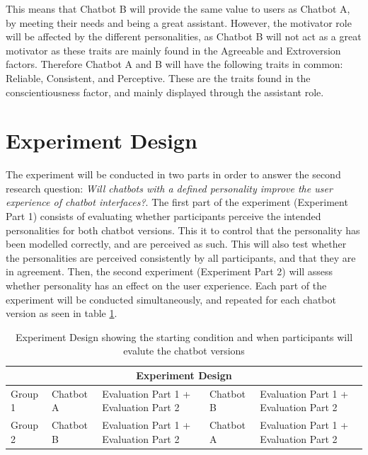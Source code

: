     This means that Chatbot B will provide the same value to users as Chatbot A, by meeting their needs and being a great assistant. However, the motivator role will be affected by the different personalities, as Chatbot B will not act as a great motivator as these traits are mainly found in the Agreeable and Extroversion factors. Therefore Chatbot A and B will have the following traits in common: Reliable, Consistent, and Perceptive. These are the traits found in the conscientiousness factor, and mainly displayed through the assistant role.

\vspace{5mm} %
    
\section{Experiment Design}

The experiment will be conducted in two parts in order to answer the second research question: \textit{Will chatbots with a defined personality improve the user experience of chatbot interfaces?}. The first part of the experiment (Experiment Part 1) consists of evaluating whether participants perceive the intended personalities for both chatbot versions. This it to control that the personality has been modelled correctly, and are perceived as such. This will also test whether the personalities are perceived consistently by all participants, and that they are in agreement. Then, the second experiment (Experiment Part 2) will assess whether personality has an effect on the user experience. Each part of the experiment will be conducted simultaneously, and repeated for each chatbot version as seen in table \ref{table:expdes}.

\vspace{2,5mm}

  \begin{table}[h]
  \centering
    \begin{tabular}{ |p{}||p{}||p{4cm}||p{}||p{4cm}| }
    \hline
    \multicolumn{5}{|c|}{Experiment Design} \\
    \hline
    Group 1 &   Chatbot A & Evaluation Part 1 + Evaluation Part 2 & Chatbot B & Evaluation Part 1 + Evaluation Part 2 \\
    \hline   
    Group 2 &   Chatbot B & Evaluation Part 1 + Evaluation Part 2 & Chatbot A & Evaluation Part 1 + Evaluation Part 2 \\
    \hline
    \end{tabular}
    \caption{Experiment Design showing the starting condition and when participants will evalute the chatbot versions}
    \label{table:expdes}
    \end{table}
    
